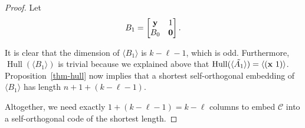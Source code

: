 \documentclass{article}
\theoremstyle{definition}
\theoremstyle{remark}
\newcommand{\Hull}{\operatorname{Hull}}
\begin{document}
\begin{proof}
Let
\[
B_1 = \begin{bmatrix}
{\bf{y}} & 1 \\
B_0   & {\bf{0}}\\
\end{bmatrix}.
\]

 It is clear that the dimension of $\langle B_1 \rangle$ is $k- \ell -1$, which is odd. Furthermore, $\Hull(\langle B_1 \rangle)$ is trivial because we explained above that $\Hull(\langle\tilde{A_1}\rangle) = \langle ( {\bf{x}}~ 1) \rangle$.  Proposition~\ref{thm-hull} now implies that a shortest self-orthogonal embedding of $\langle B_1 \rangle$ has length $n+1 + (k-\ell-1)$.

Altogether, we need exactly $1 + (k -\ell -1) = k - \ell$ columns to embed $\mathcal C$ into a self-orthogonal code of the shortest length.
\end{proof}
\end{document}

